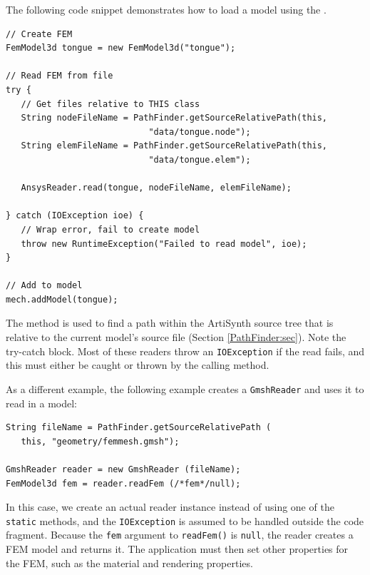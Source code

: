 The following code snippet demonstrates how to load a model using the
.
\begin{lstlisting}[]
// Create FEM
FemModel3d tongue = new FemModel3d("tongue");
      
// Read FEM from file
try {
   // Get files relative to THIS class
   String nodeFileName = PathFinder.getSourceRelativePath(this, 
                            "data/tongue.node");
   String elemFileName = PathFinder.getSourceRelativePath(this, 
                            "data/tongue.elem");

   AnsysReader.read(tongue, nodeFileName, elemFileName);

} catch (IOException ioe) {         
   // Wrap error, fail to create model
   throw new RuntimeException("Failed to read model", ioe);
}
      
// Add to model
mech.addModel(tongue);
\end{lstlisting}
The method
is used to find a path within the ArtiSynth source tree that is
relative to the current model's source file (Section
\ref{PathFinder:sec}). Note the try-catch block. Most of
these readers throw an {\tt IOException} if the read fails,
and this must either be caught or thrown by the calling method.

As a different example, the following example creates a {\tt GmshReader} and
uses it to read in a model:
%
\begin{lstlisting}[]
String fileName = PathFinder.getSourceRelativePath (
   this, "geometry/femmesh.gmsh");

GmshReader reader = new GmshReader (fileName);
FemModel3d fem = reader.readFem (/*fem*/null);
\end{lstlisting}
%
In this case, we create an actual reader instance instead of using one of the
{\tt static} methods, and the {\tt IOException} is assumed to be handled
outside the code fragment. Because the {\tt fem} argument to {\tt readFem()} is
{\tt null}, the reader creates a FEM model and returns it. The application must
then set other properties for the FEM, such as the material and rendering
properties.

